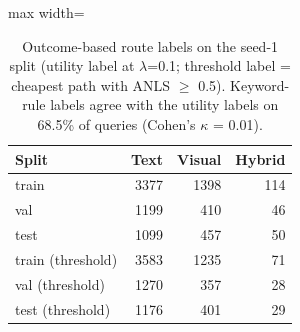\begin{table}[t]
\centering
\caption{Outcome-based route labels on the seed-1 split (utility label at $\lambda$=0.1; threshold label = cheapest path with ANLS $\geq$ 0.5). Keyword-rule labels agree with the utility labels on 68.5\% of queries (Cohen's $\kappa$ = 0.01).}
\label{tab:labels}
\begin{adjustbox}{max width=\linewidth}
\begin{tabular}{lrrr}
\toprule
\textbf{Split} & \textbf{Text} & \textbf{Visual} & \textbf{Hybrid} \\
\midrule
train & 3377 & 1398 & 114 \\
val & 1199 & 410 & 46 \\
test & 1099 & 457 & 50 \\
train (threshold) & 3583 & 1235 & 71 \\
val (threshold) & 1270 & 357 & 28 \\
test (threshold) & 1176 & 401 & 29 \\
\bottomrule
\end{tabular}
\end{adjustbox}
\end{table}
